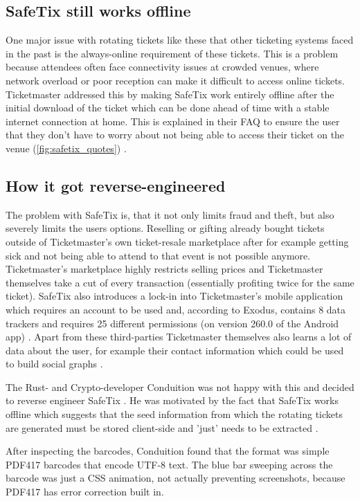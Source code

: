 \subsection{SafeTix still works offline}
One major issue with rotating tickets like these that other ticketing systems faced in the past is the always-online requirement of these tickets. This is a problem because attendees often face connectivity issues at crowded venues, where network overload or poor reception can make it difficult to access online tickets. Ticketmaster addressed this by making SafeTix work entirely offline after the initial download of the ticket which can be done ahead of time with a stable internet connection at home. This is explained in their FAQ to ensure the user that they don't have to worry about not being able to access their ticket on the venue (\ref{fig:safetix_quotes}) \cite{ticketmaster_safetix_faq}. 

\subsection{How it got reverse-engineered}
The problem with SafeTix is, that it not only limits fraud and theft, but also severely limits the users options. Reselling or gifting already bought tickets outside of Ticketmaster's own ticket-resale marketplace after for example getting sick and not being able to attend to that event is not possible anymore. Ticketmaster's marketplace highly restricts selling prices and Ticketmaster themselves take a cut of every transaction (essentially profiting twice for the same ticket). SafeTix also introduces a lock-in into Ticketmaster's mobile application which requires an account to be used and, according to Exodus, contains 8 data trackers and requires 25 different permissions (on version 260.0 of the Android app) \cite{exodus}. Apart from these third-parties Ticketmaster themselves also learns a lot of data about the user, for example their contact information which could be used to build social graphs \cite{reverse_engineering_ticketmaster}.

The Rust- and Crypto-developer Conduition was not happy with this and decided to reverse engineer SafeTix \cite{conduition}. He was motivated by the fact that SafeTix works offline which suggests that the seed information from which the rotating tickets are generated must be stored client-side and 'just' needs to be extracted \cite{reverse_engineering_ticketmaster}.

After inspecting the barcodes, Conduition found that the format was simple PDF417 barcodes that encode UTF-8 text. 
The blue bar sweeping across the barcode was just a CSS animation, not actually preventing screenshots, because PDF417 has error correction built in.

